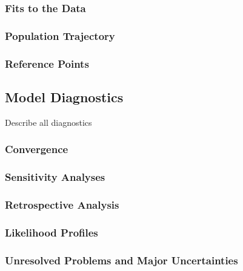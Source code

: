 \documentclass[11pt,
  english,
  letterpaper,
]{article}
\begin{document}
\hypertarget{fits-to-the-data}{%
\subsubsection{Fits to the Data}\label{fits-to-the-data}}

\hypertarget{population-trajectory}{%
\subsubsection{Population Trajectory}\label{population-trajectory}}

\hypertarget{reference-points-1}{%
\subsubsection{Reference Points}\label{reference-points-1}}

\hypertarget{model-diagnostics}{%
\subsection{Model Diagnostics}\label{model-diagnostics}}

Describe all diagnostics

\hypertarget{convergence}{%
\subsubsection{Convergence}\label{convergence}}

\hypertarget{sensitivity-analyses}{%
\subsubsection{Sensitivity Analyses}\label{sensitivity-analyses}}

\hypertarget{retrospective-analysis}{%
\subsubsection{Retrospective Analysis}\label{retrospective-analysis}}

\hypertarget{likelihood-profiles}{%
\subsubsection{Likelihood Profiles}\label{likelihood-profiles}}

\hypertarget{unresolved-problems-and-major-uncertainties-1}{%
\subsubsection{Unresolved Problems and Major Uncertainties}\label{unresolved-problems-and-major-uncertainties-1}}
\end{document}
